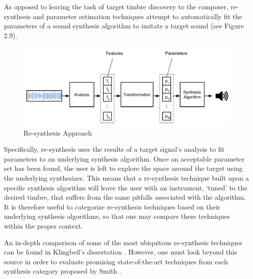 \documentclass[12pt]{report} 	%
\numberwithin{figure}{chapter}
\numberwithin{table}{chapter}
\numberwithin{equation}{chapter}
\begin{document}
\begin{flushleft}
As opposed to leaving the task of target timbre discovery to the composer, re-synthesis and parameter estimation techniques attempt to automatically fit the parameters of a sound synthesis algorithm to imitate a target sound (see Figure 2.9). \begin{figure}[h!]
\begin{center}
\includegraphics[scale=0.5]{ResynthesisIdea}
\caption[Re-synthesis]{Re-synthesis Approach}
\end{center}
\end{figure}
Specifically, re-synthesis uses the results of a target signal's analysis to fit parameters to an underlying synthesis algorithm. Once an acceptable parameter set has been found, the user is left to explore the space around the target using the underlying synthesizer. This means that a re-synthesis technique built upon a specific synthesis algorithm will leave the user with an instrument, `tuned' to the desired timbre, that suffers from the same pitfalls associated with the algorithm. It is therefore useful to categorize re-synthesis techniques based on their underlying synthesis algorithms, so that one may compare these techniques within the proper context.

An in-depth comparison of some of the most ubiquitous re-synthesis techniques can be found in Klingbeil's dissertation \cite{Klingbeil:2009lo}. However, one must look beyond this source in order to evaluate promising state-of-the-art techniques from each synthesis category proposed by Smith \cite{III:1991hc}.


\end{flushleft}
\end{document}
